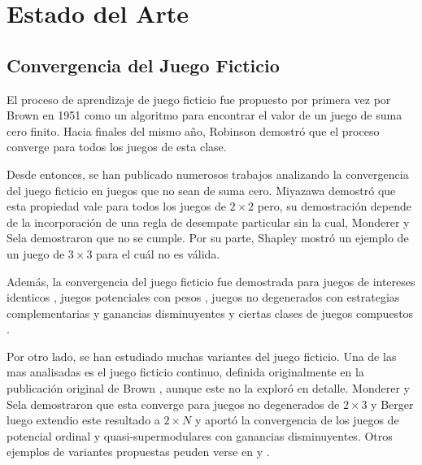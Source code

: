 \chapter{Estado del Arte}  \label{cap:relwork}

\section{Convergencia del Juego Ficticio}

El proceso de aprendizaje de juego ficticio fue propuesto por primera vez por Brown en 1951 \cite{brown:1951} como un algoritmo para encontrar el valor de un juego de suma cero finito. Hacia finales del mismo año, Robinson \cite{robinson:zerosum} demostró que el proceso converge para todos los juegos de esta clase.

Desde entonces, se han publicado numerosos trabajos analizando la convergencia del juego ficticio en juegos que no sean de suma cero. Miyazawa \cite{miyazawa:2x2} demostró que esta propiedad vale para todos los juegos de $2 \times 2$ pero, su demostración depende de la incorporación de una regla de desempate particular sin la cual, Monderer y Sela \cite{2x2:without} demostraron que no se cumple. Por su parte, Shapley \cite{shapley:3x3} mostró un ejemplo de un juego de $3 \times 3$ para el cuál no es válida.

Además, la convergencia del juego ficticio fue demostrada para juegos de intereses identicos \cite{identical:interests}, juegos potenciales con pesos \cite{weighted:potential}, juegos no degenerados con estrategias complementarias y ganancias disminuyentes \cite{strategic:complementarities} y ciertas clases de juegos compuestos \cite{compound}.

Por otro lado, se han estudiado muchas variantes del juego ficticio. Una de las mas analisadas es el juego ficticio continuo, definida originalmente en la publicación original de Brown \cite{brown:1951}, aunque este no la exploró en detalle. Monderer y Sela \cite{no:cycling} demostraron que esta converge para juegos no degenerados de $2 \times 3$ y Berger luego extendio este resultado a $2 \times N$ \cite{berger:2xn} y aportó la convergencia de los juegos de potencial ordinal y quasi-supermodulares con ganancias disminuyentes. Otros ejemplos de variantes propuestas peuden verse en \cite{pattern:recog} y \cite{new:kind:fp}.

